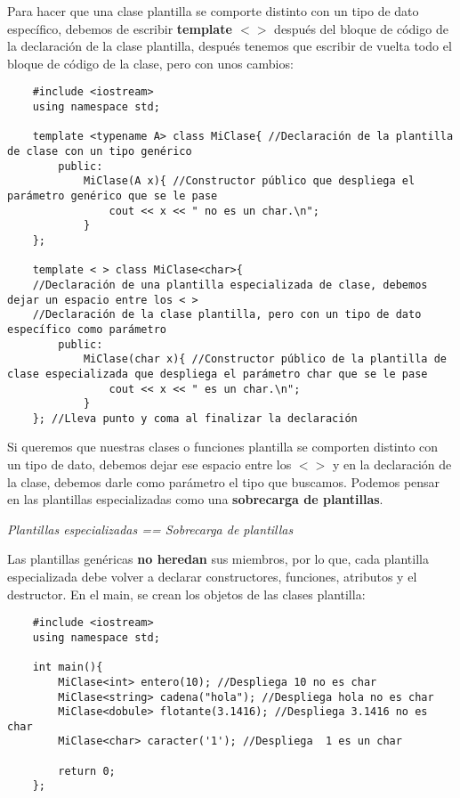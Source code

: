 Para hacer que una clase plantilla se comporte distinto con un tipo de dato específico, debemos de escribir \textbf{template $< >$} después del bloque de código de la declaración de la clase plantilla, después tenemos que escribir de vuelta todo el bloque de código de la clase, pero con unos cambios:
\begin{lstlisting}
    #include <iostream>
    using namespace std;
    
    template <typename A> class MiClase{ //Declaración de la plantilla de clase con un tipo genérico
        public:
            MiClase(A x){ //Constructor público que despliega el parámetro genérico que se le pase
                cout << x << " no es un char.\n";
            }
    };
    
    template < > class MiClase<char>{
    //Declaración de una plantilla especializada de clase, debemos dejar un espacio entre los < >
    //Declaración de la clase plantilla, pero con un tipo de dato específico como parámetro
        public:
            MiClase(char x){ //Constructor público de la plantilla de clase especializada que despliega el parámetro char que se le pase
                cout << x << " es un char.\n";
            }
    }; //Lleva punto y coma al finalizar la declaración
\end{lstlisting}

Si queremos que nuestras clases o funciones plantilla se comporten distinto con un tipo de dato, debemos dejar ese espacio entre los $< >$ y en la declaración de la clase, debemos darle como parámetro el tipo que buscamos. Podemos pensar en las plantillas especializadas como una \textbf{sobrecarga de plantillas}.
\begin{center}
    \textit{Plantillas especializadas == Sobrecarga de plantillas}
\end{center}

Las plantillas genéricas \textbf{no heredan} sus miembros, por lo que, cada plantilla especializada debe volver a declarar constructores, funciones, atributos y el destructor. En el main, se crean los objetos de las clases plantilla:
\begin{lstlisting}
    #include <iostream>
    using namespace std;
    
    int main(){
        MiClase<int> entero(10); //Despliega 10 no es char
        MiClase<string> cadena("hola"); //Despliega hola no es char
        MiClase<dobule> flotante(3.1416); //Despliega 3.1416 no es char
        MiClase<char> caracter('1'); //Despliega  1 es un char
        
        return 0;
    };
\end{lstlisting}




